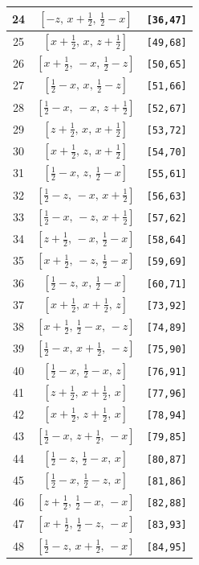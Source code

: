 \documentclass[fleqn,8pt]{jsarticle}
\begin{document}
\begin{longtable}{ccc}
24 & $\left[ - z,\, x + \frac{1}{2},\, \frac{1}{2} - x \right]$ & {\tt [36,47]} \\ \hline
25 & $\left[ x + \frac{1}{2},\, x,\, z + \frac{1}{2} \right]$ & {\tt [49,68]} \\ \hline
26 & $\left[ x + \frac{1}{2},\, - x,\, \frac{1}{2} - z \right]$ & {\tt [50,65]} \\ \hline
27 & $\left[ \frac{1}{2} - x,\, x,\, \frac{1}{2} - z \right]$ & {\tt [51,66]} \\ \hline
28 & $\left[ \frac{1}{2} - x,\, - x,\, z + \frac{1}{2} \right]$ & {\tt [52,67]} \\ \hline
29 & $\left[ z + \frac{1}{2},\, x,\, x + \frac{1}{2} \right]$ & {\tt [53,72]} \\ \hline
30 & $\left[ x + \frac{1}{2},\, z,\, x + \frac{1}{2} \right]$ & {\tt [54,70]} \\ \hline
31 & $\left[ \frac{1}{2} - x,\, z,\, \frac{1}{2} - x \right]$ & {\tt [55,61]} \\ \hline
32 & $\left[ \frac{1}{2} - z,\, - x,\, x + \frac{1}{2} \right]$ & {\tt [56,63]} \\ \hline
33 & $\left[ \frac{1}{2} - x,\, - z,\, x + \frac{1}{2} \right]$ & {\tt [57,62]} \\ \hline
34 & $\left[ z + \frac{1}{2},\, - x,\, \frac{1}{2} - x \right]$ & {\tt [58,64]} \\ \hline
35 & $\left[ x + \frac{1}{2},\, - z,\, \frac{1}{2} - x \right]$ & {\tt [59,69]} \\ \hline
36 & $\left[ \frac{1}{2} - z,\, x,\, \frac{1}{2} - x \right]$ & {\tt [60,71]} \\ \hline
37 & $\left[ x + \frac{1}{2},\, x + \frac{1}{2},\, z \right]$ & {\tt [73,92]} \\ \hline
38 & $\left[ x + \frac{1}{2},\, \frac{1}{2} - x,\, - z \right]$ & {\tt [74,89]} \\ \hline
39 & $\left[ \frac{1}{2} - x,\, x + \frac{1}{2},\, - z \right]$ & {\tt [75,90]} \\ \hline
40 & $\left[ \frac{1}{2} - x,\, \frac{1}{2} - x,\, z \right]$ & {\tt [76,91]} \\ \hline
41 & $\left[ z + \frac{1}{2},\, x + \frac{1}{2},\, x \right]$ & {\tt [77,96]} \\ \hline
42 & $\left[ x + \frac{1}{2},\, z + \frac{1}{2},\, x \right]$ & {\tt [78,94]} \\ \hline
43 & $\left[ \frac{1}{2} - x,\, z + \frac{1}{2},\, - x \right]$ & {\tt [79,85]} \\ \hline
44 & $\left[ \frac{1}{2} - z,\, \frac{1}{2} - x,\, x \right]$ & {\tt [80,87]} \\ \hline
45 & $\left[ \frac{1}{2} - x,\, \frac{1}{2} - z,\, x \right]$ & {\tt [81,86]} \\ \hline
46 & $\left[ z + \frac{1}{2},\, \frac{1}{2} - x,\, - x \right]$ & {\tt [82,88]} \\ \hline
47 & $\left[ x + \frac{1}{2},\, \frac{1}{2} - z,\, - x \right]$ & {\tt [83,93]} \\ \hline
48 & $\left[ \frac{1}{2} - z,\, x + \frac{1}{2},\, - x \right]$ & {\tt [84,95]} \\
\end{longtable}
\end{document}
